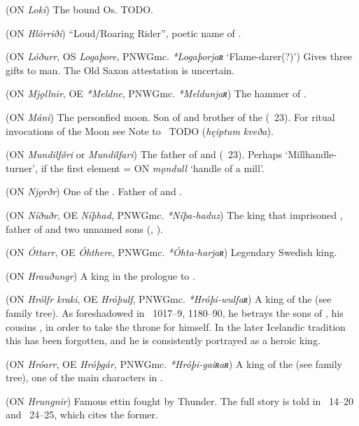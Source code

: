 \begin{itemize}
 (ON \emph{Loki})
  The bound Os. TODO.

 (ON \emph{Hlórriði})
  “Loud/Roaring Rider”, poetic name of .

 (ON \emph{Lóðurr}, OS \emph{Logaþore}, PNWGmc. \emph{*Logaþorjaʀ} ‘Flame-darer(?)’)
  Gives three gifts to man.  The Old Saxon attestation is uncertain.

 (ON \emph{Mjǫllnir}, OE \emph{*Meldne}, PNWGmc. \emph{*Meldunjaʀ})
  The hammer of .

 (ON \emph{Máni})
  The personfied moon.  Son of  and brother of the  (\Vafthrudnismal\ 23).  For ritual invocations of the Moon see Note to \Havamal\ TODO (\emph{hęiptum kveða}).

 (ON \emph{Mundilfǿri} or \emph{Mundilfari})
  The father of  and  (\Vafthrudnismal\ 23).  Perhaps ‘Millhandle-turner’, if the first element = ON \emph{mǫndull} ‘handle of a mill’.

 (ON \emph{Njǫrðr})
  One of the . Father of  and .

 (ON \emph{Níðuðr}, OE \emph{Níþhad}, PNWGmc. \emph{*Níþa-haduz})
  The king that imprisoned , father of  and two unnamed sons (\Volundarkvida, \Deor).

 (ON \emph{Óttarr}, OE \emph{Óhthere}, PNWGmc. \emph{*Óhta-harjaʀ})
  Legendary Swedish king.

 (ON \emph{Hrauðungr})
  A king in the prologue to \Grimnismal.

 (ON \emph{Hrólfr kraki}, OE \emph{Hróþulf}, PNWGmc. \emph{*Hróþi-wulfaʀ})
  A king of the  (see family tree). As foreshadowed in \Beowulf\ 1017–9, 1180–90, he betrays the sons of , his cousins , in order to take the throne for himself. In the later Icelandic tradition this has been forgotten, and he is consistently portrayed as a heroic king.

 (ON \emph{Hróarr}, OE \emph{Hróþgár}, PNWGmc. \emph{*Hróþi-gaiʀaʀ})
  A king of the  (see family tree), one of the main characters in \Beowulf.

 (ON \emph{Hrungnir})
  Famous ettin fought by Thunder.  The full story is told in \Haustlong\ 14–20 and \Skaldskaparmal\ 24–25, which cites the former.


\end{itemize}
